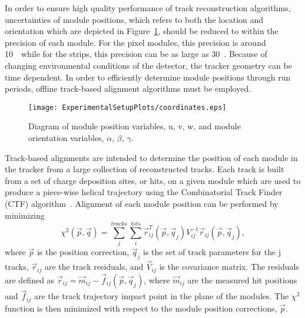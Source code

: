 In order to ensure high quality performance of track 
reconstruction algorithms, uncertainties of
module positions, which refers to both the location and
orientation which are depicted in 
Figure~\ref{fig:ModuleCoordinates}, should be reduced to within 
the precision of each module.  For the pixel modules, this 
precision is around 10~\microns~while for the strips, this 
precision can be as large as 30~\microns.  Because of changing 
environmental conditions of the detector, the tracker geometry can 
be time dependent. In order to efficiently determine module 
positions through run periods, offline track-based alignment 
algorithms must be employed.  

\begin{figure}
\begin{center}
\texttt{[image: ExperimentalSetupPlots/coordinates.eps]}
\caption{Diagram of module position variables, u, v, w, and module orientation
variables, $\alpha$, $\beta$, $\gamma$.}
\label{fig:ModuleCoordinates}
\end{center}
\end{figure}

Track-based alignments are intended to determine the position of each module
in the tracker from a large collection of reconstructed tracks.  Each track
is built from a set of charge deposition sites, or hits, on a given module
which are used to produce a piece-wise helical trajectory using the
Combinatorial Track Finder (CTF) algorithm~\cite{Borrello:2010zz}.  
Alignment of each module position can be performed by minimizing
\begin{equation}
\chi^2(\vec{p},\vec{q}) = \sum_{j}^{tracks}\sum_{i}^{hits}\vec{r}_{ij}^{T}(\vec{p},\vec{q}_j)V^{-1}_{ij}\vec{r}_{ij}(\vec{p},\vec{q}_j),
\end{equation}
where $\vec{p}$ is the position correction, $\vec{q}_j$ is the set of 
track parameters for the j tracks, $\vec{r}_{ij}$ are the track 
residuals, and $\vec{V}_{ij}$ is the covariance matrix.  The residuals are
defined as $\vec{r}_{ij} = \vec{m}_{ij} - \vec{f}_{ij}(\vec{p},\vec{q}_j)$, 
where $\vec{m}_{ij}$ are the measured hit positions and $\vec{f}_{ij}$ are
the track trajectory impact point in the plane of the modules.  The 
$\chi^2$ function is then minimized with respect to the module position 
corrections, $\vec{p}$.


